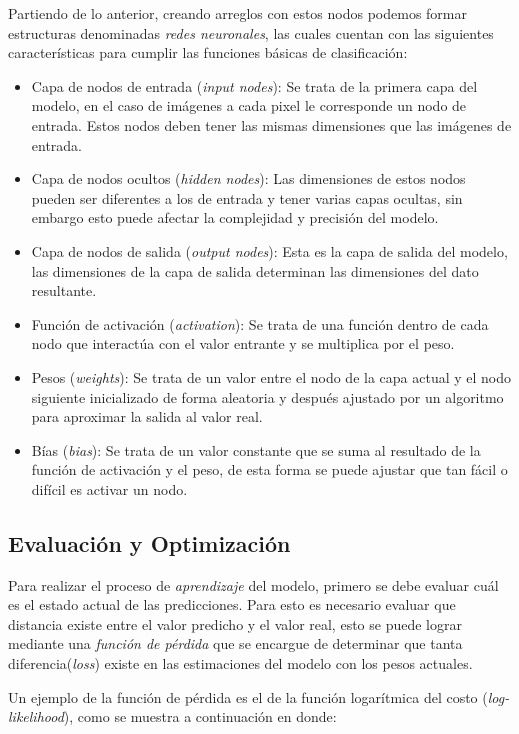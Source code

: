 Partiendo de lo anterior, creando arreglos con estos nodos podemos formar estructuras denominadas \emph{redes neuronales}, las cuales cuentan con las siguientes características para cumplir las funciones básicas de clasificación:

\begin{itemize}
    \item Capa de nodos de entrada (\emph{input nodes}): Se trata de la primera capa del modelo, en el caso de imágenes a cada pixel le corresponde un nodo de entrada. Estos nodos deben tener las mismas dimensiones que las imágenes de entrada.
    \item Capa de nodos ocultos (\emph{hidden nodes}): Las dimensiones de estos nodos pueden ser diferentes a los de entrada y tener varias capas ocultas, sin embargo esto puede afectar la complejidad y precisión del modelo.
    \item Capa de nodos de salida (\emph{output nodes}): Esta es la capa de salida del modelo, las dimensiones de la capa de salida determinan las dimensiones del dato resultante.
    \item Función de activación (\emph{activation}): Se trata de una función dentro de cada nodo que interactúa con el valor entrante y se multiplica por el peso.
    \item Pesos (\emph{weights}): Se trata de un valor entre el nodo de la capa actual y el nodo siguiente inicializado de forma aleatoria y después ajustado por un algoritmo para aproximar la salida al valor real.
    \item Bías (\emph{bias}): Se trata de un valor constante que se suma al resultado de la función de activación y el peso, de esta forma se puede ajustar que tan fácil o difícil es activar un nodo.
\end{itemize}


\subsection{Evaluación y Optimización}
Para realizar el proceso de \emph{aprendizaje} del modelo, primero se debe evaluar cuál es el estado actual de las predicciones. Para esto es necesario evaluar que distancia existe entre el valor predicho y el valor real, esto se puede lograr mediante una \emph{función de pérdida} que se encargue de determinar que tanta diferencia(\emph{loss}) existe en las estimaciones del modelo con los pesos actuales.

Un ejemplo de la función de pérdida es el de la función logarítmica del costo (\emph{log-likelihood}), como se muestra a continuación en donde:

